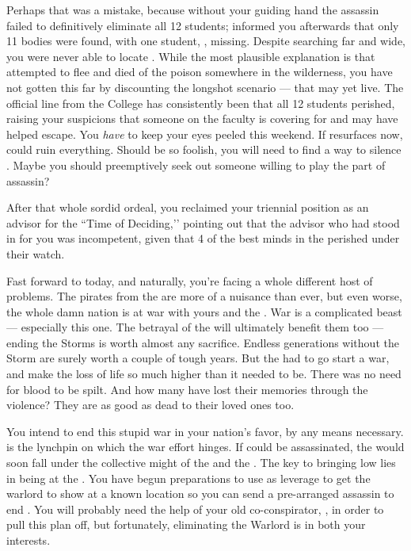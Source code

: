 \documentclass[char]{GL2020}
\begin{document}
Perhaps that was a mistake, because without your guiding hand the assassin failed to definitively eliminate all 12 students; \cDiplomat{} informed you afterwards that only 11 bodies were found, with one student, \cKidScientist{\intro}, missing. Despite searching far and wide, you were never able to locate \cKidScientist{\them}. While the most plausible explanation is that \cKidScientist{\they} attempted to flee and died of the poison somewhere in the wilderness, you have not gotten this far by discounting the longshot scenario — that \cKidScientist{} may yet live. The official line from the College has consistently been that all 12 students perished, raising your suspicions that someone on the faculty is covering for \cKidScientist{} and may have helped \cKidScientist{\them} escape. You \emph{have} to keep your eyes peeled this weekend. If \cKidScientist{} resurfaces now, \cKidScientist{\they} could ruin everything. Should \cKidScientist{\they} be so foolish, you will need to find a way to silence \cKidScientist{\them}. Maybe you should preemptively seek out someone willing to play the part of assassin? 

After that whole sordid ordeal, you reclaimed your triennial position as an advisor for the ``Time of Deciding,’’ pointing out that the advisor who had stood in for you was incompetent, given that 4 of the best minds in the \pFarm{} perished under their watch.

Fast forward to today, and naturally, you’re facing a whole different host of problems. The pirates from the \pShip{} are more of a nuisance than ever, but even worse, the whole damn nation is at war with yours and the \pTech{}. War is a complicated beast — especially this one. The betrayal of the \pShip{} will ultimately benefit them too — ending the Storms is worth almost any sacrifice. Endless generations without the Storm are surely worth a couple of tough years. But the \pShip{} had to go start a war, and make the loss of life so much higher than it needed to be. There was no need for \pFarm{} blood to be spilt. And how many \pShippies{} have lost their memories through the violence? They are as good as dead to their loved ones too. 

You intend to end this stupid war in your nation's favor, by any means necessary. \cLoud{\intro} is the lynchpin on which the \pShip{} war effort hinges. If \cLoud{\they} could be assassinated, the \pShip{} would soon fall under the collective might of the \pFarm{} and the \pTech{}. The key to bringing \cLoud{} low lies in \cLoud{\their} \cWarlordDaughter{\offspring} being at the \pSchool{}. You have begun preparations to use \cWarlordDaughter{\them} as leverage to get the warlord to show \cLoud{\themself} at a known location so you can send a pre-arranged assassin to end \cLoud{\them}. You will probably need the help of your old co-conspirator, \cDiplomat{}, in order to pull this plan off, but fortunately, eliminating the Warlord is in both your interests.
\end{document}
